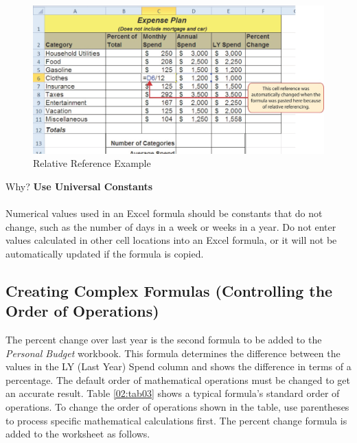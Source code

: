 \begin{figure}[H]
	\centering
	\includegraphics[width=\maxwidth{.95\linewidth}]{gfx/ch02_fig05}
	\caption{Relative Reference Example}
	\label{02:fig05}
\end{figure}

\begin{center}
	\begin{infobox}{Why?}
		\textbf{Use Universal Constants}
		\\
		\\
		Numerical values used in an Excel formula should be constants that do not change, such as the number of days in a week or weeks in a year. Do not enter values calculated in other cell locations into an Excel formula, or it will not be automatically updated if the formula is copied. 
	\end{infobox}
\end{center}

\subsection{Creating Complex Formulas (Controlling the Order of Operations)}

The percent change over last year is the second formula to be added to the \textit{Personal Budget} workbook. This formula determines the difference between the values in the LY (Last Year) Spend column and shows the difference in terms of a percentage. The default order of mathematical operations must be changed to get an accurate result. Table \ref{02:tab03} shows a typical formula's standard order of operations. To change the order of operations shown in the table, use parentheses to process specific mathematical calculations first. The percent change formula is added to the worksheet as follows.

